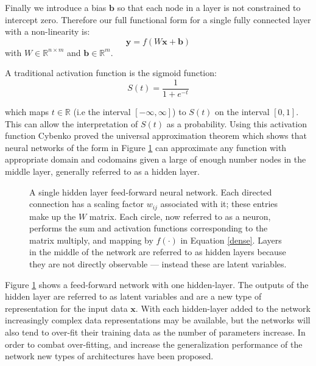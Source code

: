 Finally we introduce a bias $\mathbf{b}$ so that each node in a layer is not
constrained to intercept zero. Therefore our full functional form for a single fully
connected layer with a non-linearity is:
\begin{equation}
\mathbf{y} = f\left(W\mathbf{x} + \mathbf{b}\right)
\label{dense}
\end{equation}
with $W \in \mathbb{R}^{n\times m}$ and $\mathbf{b} \in \mathbb{R}^m$.

A traditional activation function is the sigmoid function:
\begin{equation}
S(t) = \frac{1}{1 + e^{-t}}
\end{equation}

which maps $t \in \mathbb{R}$ (i.e the interval $[-\infty, \infty]$) to $S(t)$
on the interval $[0,1]$. This can allow the interpretation of $S(t)$ as a
probability. Using this activation function Cybenko proved the universal
approximation theorem \cite{cybenko1989approximation} which shows that neural
networks of the form in Figure \ref{densenn} can approximate any function with
appropriate domain and codomains given a large of enough number nodes in the
middle layer, generally referred to as a hidden layer.

\begin{figure}
\begin{center}

\end{center}
\caption[Feed-forward fully-connected network]{A single hidden layer feed-forward neural network. Each directed
connection has a scaling factor $w_{ij}$ associated with it; these entries make
up the $W$ matrix. Each circle, now referred to as a neuron, performs the
sum and activation functions corresponding to the matrix multiply, and
mapping by $f(\cdot)$ in Equation \ref{dense}. Layers in the middle of the
network are referred to as hidden layers because they are not directly observable
--- instead these are latent variables.}
\label{densenn}
\end{figure}

Figure \ref{densenn} shows a feed-forward network with one hidden-layer. The
outputs of the hidden layer are referred to as latent variables and are a new type of
representation for the input data $\mathbf{x}$. With each hidden-layer added to
the network increasingly complex data representations may be available, but the
networks will also tend to over-fit their training data as the number of
parameters increase. In order to combat over-fitting, and increase the
generalization performance of the network new types of architectures have been
proposed.


